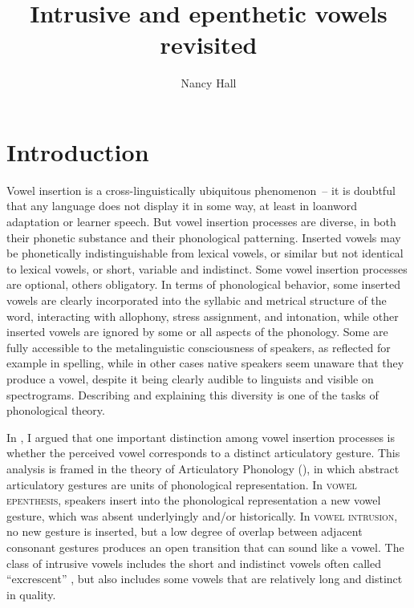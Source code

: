 \documentclass[output=paper,colorlinks,citecolor=brown]{langscibook}
\author{Nancy Hall\affiliation{California State University Long Beach}}
\title{Intrusive and epenthetic vowels revisited}
\begin{document}
\maketitle \label{ch8}

\section{Introduction} 
Vowel insertion is a cross-linguistically ubiquitous phenomenon~-- it is doubtful that any language does not display it in some way, at least in loanword adaptation or learner speech. But vowel insertion processes are diverse, in both their phonetic substance and their phonological patterning. Inserted vowels may be phonetically indistinguishable from lexical vowels, or similar but not identical to lexical vowels, or short, variable and indistinct. Some vowel insertion processes are optional, others obligatory. In terms of phonological behavior, some inserted vowels are clearly incorporated into the syllabic and metrical structure of the word, interacting with allophony, stress assignment, and intonation, while other inserted vowels are ignored by some or all aspects of the phonology. Some are fully accessible to the metalinguistic consciousness of speakers, as reflected for example in spelling, while in other cases native speakers seem unaware that they produce a vowel, despite it being clearly audible to linguists and visible on spectrograms. Describing and explaining this diversity is one of the tasks of phonological theory.

In \citet{Hall2006}, I argued that one important distinction among vowel insertion processes is whether the perceived vowel corresponds to a distinct articulatory gesture. This analysis is framed in the theory of Articulatory Phonology (\cite{browman1992articulatory}), in which abstract articulatory gestures are units of phonological representation. In \textsc{vowel epenthesis}, speakers insert into the phonological representation a new vowel gesture, which was absent underlyingly and/or historically. In \textsc{vowel} \textsc{intrusion}, no new gesture is inserted, but a low degree of overlap between adjacent consonant gestures produces an open transition that can sound like a vowel. The class of intrusive vowels includes the short and indistinct vowels often called “excrescent” \citep{Levin1987}, but also includes some vowels that are relatively long and distinct in quality. 
\end{document}
